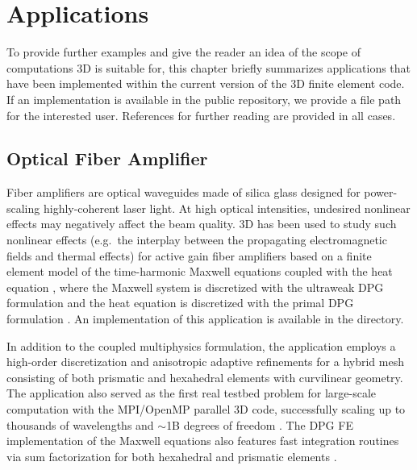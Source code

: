 %
%

\chapter{Applications}
\label{chap:applications}


To provide further examples and give the reader an idea of the scope of computations \hp3D is suitable for, this chapter briefly summarizes applications that have been implemented within the current version of the \hp3D finite element code. If an implementation is available in the public repository, we provide a file path for the interested user. References for further reading are provided in all cases.

\section{Optical Fiber Amplifier}
\label{sec:laser}

Fiber amplifiers are optical waveguides made of silica glass designed for power-scaling highly-coherent laser light. At high optical intensities, undesired nonlinear effects may negatively affect the beam quality. \hp3D has been used to study such nonlinear effects (e.g.~the interplay between the propagating electromagnetic fields and thermal effects) for active gain fiber amplifiers based on a finite element model of the time-harmonic Maxwell equations coupled with the heat equation \cite{henneking2024envelope, henneking2021fiber, nagaraj2018raman}, where the Maxwell system is discretized with the ultraweak DPG formulation \cite{carstensen2016breaking} and the heat equation is discretized with the primal DPG formulation \cite{roberts2021time}. An implementation of this application is available in the  directory.

In addition to the coupled multiphysics formulation, the application employs a high-order discretization and anisotropic adaptive refinements \cite{henneking2021pollution} for a hybrid mesh consisting of both prismatic and hexahedral elements with curvilinear geometry. The application also served as the first real testbed problem for large-scale computation with the MPI/OpenMP parallel \hp3D code, successfully scaling up to thousands of wavelengths and $\sim$1B degrees of freedom \cite{henneking2021phd,henneking2022parallel}. The DPG FE implementation of the Maxwell equations also features fast integration routines via sum factorization for both hexahedral and prismatic elements \cite{mora2019fast,badger2020fast}.


